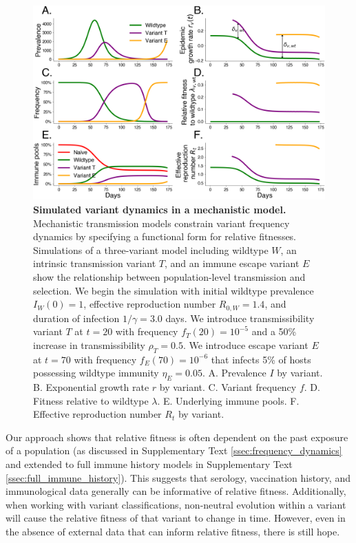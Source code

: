\documentclass[11pt,oneside,letterpaper]{article}
\newcommand{\wt}{W}
\newcommand{\varEscape}{\eta}
\newcommand{\varTransmission}{\rho}
\begin{document}
\begin{figure}[h]
    \centering
    \includegraphics[width=1.0\linewidth]{./figures/vis_mechanisms.png}
    \caption{
      \textbf{Simulated variant dynamics in a mechanistic model.}
      Mechanistic transmission models constrain variant frequency dynamics by specifying a functional form for relative fitnesses.
      Simulations of a three-variant model including wildtype $W$, an intrinsic transmission variant $T$, and an immune escape variant $E$ show the relationship between population-level transmission and selection.
      We begin the simulation with initial wildtype prevalence $I_\wt(0) = 1$, effective reproduction number $R_{0,\wt} = 1.4$, and duration of infection $1/\gamma = 3.0$ days.
      We introduce transmissibility variant $T$ at $t=20$ with frequency $f_T(20) = 10^{-5}$ and a 50\% increase in transmissibility $\varTransmission_T = 0.5$.
      We introduce escape variant $E$ at $t=70$ with frequency $f_E(70) = 10^{-6}$ that infects 5\% of hosts possessing wildtype immunity $\varEscape_E = 0.05$.
      A. Prevalence $I$ by variant.
      B. Exponential growth rate $r$ by variant.
      C. Variant frequency $f$.
      D. Fitness relative to wildtype $\lambda$.
      E. Underlying immune pools.
      F. Effective reproduction number $R_t$ by variant.
    }
    \label{fig:vis_mechanisms}
\end{figure}


Our approach shows that relative fitness is often dependent on the past exposure of a population (as discussed in Supplementary Text \ref{ssec:frequency_dynamics} and extended to full immune history models in Supplementary Text \ref{ssec:full_immune_history}).
This suggests that serology, vaccination history, and immunological data generally can be informative of relative fitness.
Additionally, when working with variant classifications, non-neutral evolution within a variant will cause the relative fitness of that variant to change in time.
However, even in the absence of external data that can inform relative fitness, there is still hope.
\end{document}
